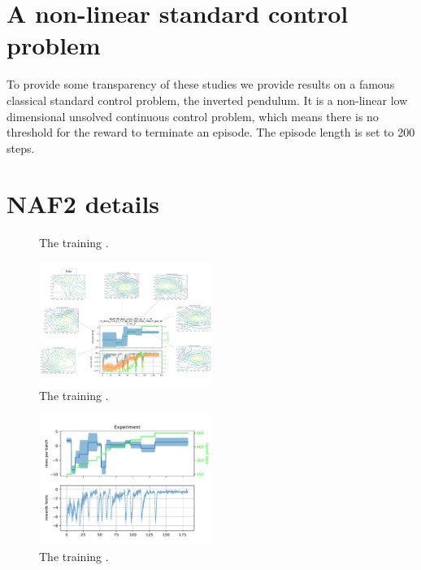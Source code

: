\documentclass[
 reprint,
 amsmath,amssymb,amsfonts,clevref,
 aps,
prstab,
]{revtex4-2}
\begin{document}
\appendix
\section{A non-linear standard control problem}
To provide some transparency of these studies we provide results on a famous classical standard control problem, the inverted pendulum. It is a non-linear low dimensional unsolved continuous control problem, which means there is no threshold for the reward to terminate an episode. The episode length is set to 200 steps.
\section{NAF2 details}\label{appendix:pernaf}

\begin{figure}[!h]
  \centering
  
  \caption{The training .}
  \label{fig:comparsion_per}
\end{figure}


\begin{figure}[!h]
  \centering
  \includegraphics*[width=0.5\textwidth]{Figures/Learning_evolution}
  \caption{The training .}
  \label{fig:comparsion_per}
\end{figure}

\begin{figure}[!h]
  \centering
  \includegraphics*[width=0.5\textwidth]{Figures/AE-DYNA_observables.pdf}
  \caption{The training .}
  \label{fig:comparsion_per}
\end{figure}
\end{document}
